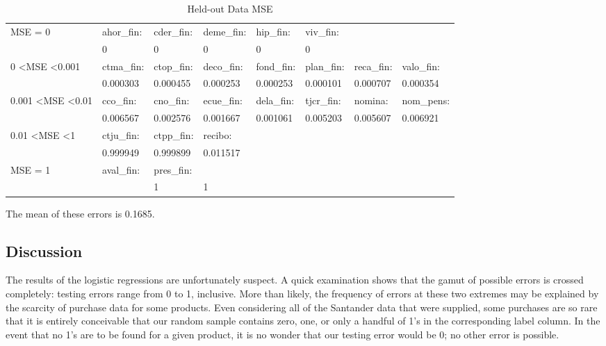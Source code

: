 \documentclass{article}
\begin{document}
\begin{spacing}{1}
\begin{large}
\begin{table}[h]\footnotesize
	\centering
	\caption{Held-out Data MSE}
	\label{my-label}
	\begin{tabular}{llllllll}
		\hline
		MSE = 0                            & ahor\_fin:  & cder\_fin: & deme\_fin: & hip\_fin:  & viv\_fin:  &                     &            \\
		& 0                    & 0          & 0          & 0          & 0          &                     &            \\ \hline
		0 \textless MSE \textless 0.001      & ctma\_fin:          & ctop\_fin: & deco\_fin: & fond\_fin: & plan\_fin: & reca\_fin:  & valo\_fin: \\
		& 0.000303            & 0.000455   & 0.000253   & 0.000253   & 0.000101   &  0.000707             & 0.000354   \\ \hline
		0.001 \textless MSE \textless 0.01 & cco\_fin:           & cno\_fin:  & ecue\_fin: & dela\_fin: & tjcr\_fin: & nomina:             & nom\_pens: \\
		& 0.006567            & 0.002576   & 0.001667   & 0.001061   & 0.005203   & 0.005607            & 0.006921   \\ \hline
		0.01 \textless MSE \textless 1     & ctju\_fin:          & ctpp\_fin: & recibo:    &            &            &                     &            \\
		& 0.999949            & 0.999899   & 0.011517   &            &            &                     &            \\ \hline
		MSE = 1                            & aval\_fin:          & pres\_fin: &            &            &            &                     &\\
		&                    & 1          &1           &            &            &                     & \\
		\hline
	\end{tabular}
\end{table}
The mean of these errors is 0.1685.

\subsection{Discussion}

The results of the logistic regressions are unfortunately suspect. A quick examination shows that the gamut of possible errors is crossed completely: testing errors range from 0 to 1, inclusive. More than likely, the frequency of errors at these two extremes may be explained by the scarcity of purchase data for some products. Even considering all of the Santander data that were supplied, some purchases are so rare that it is entirely conceivable that our random sample contains zero, one, or only a handful of 1's in the corresponding label column. In the event that no 1's are to be found for a given product, it is no wonder that our testing error would be 0; no other error is possible.


\end{large}
\end{spacing}
\end{document}
